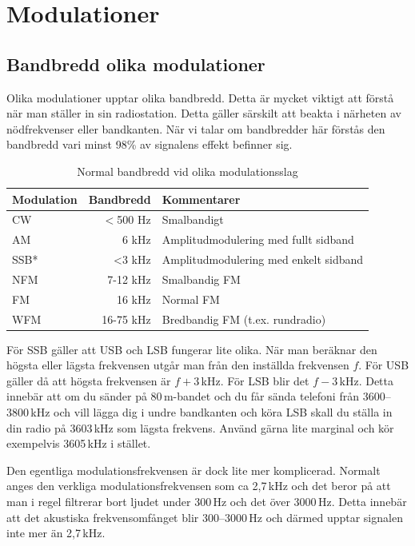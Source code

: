 \section{Modulationer}

\subsection{Bandbredd olika modulationer}

Olika modulationer upptar olika bandbredd. Detta är mycket viktigt att förstå
när man ställer in sin radiostation. Detta gäller särskilt att beakta i
närheten av nödfrekvenser eller bandkanten. När vi talar om bandbredder här
förstås den bandbredd vari minst 98\% av signalens effekt befinner sig.

\begin{table}[H]
\centering
\begin{tabular}{lrl}
	\textbf{Modulation} & \textbf{Bandbredd} & \textbf{Kommentarer}                  \\ \hline
	CW                  &          $<$500 Hz & Smalbandigt                           \\
	AM                  &              6 kHz & Amplitudmodulering med fullt sidband  \\
	SSB*                &              <3 kHz & Amplitudmodulering med enkelt sidband \\
	NFM                 &           7-12 kHz & Smalbandig FM                         \\
	FM                  &             16 kHz & Normal FM                             \\
	WFM                 &          16-75 kHz & Bredbandig FM (t.ex. rundradio)
\end{tabular}
\caption{Normal bandbredd vid olika modulationsslag}
\end{table}

För SSB gäller att USB och LSB fungerar lite olika. När man beräknar den
högsta eller lägsta frekvensen utgår man från den inställda frekvensen $f$.
För USB gäller då att högsta frekvensen är $f+3$\,kHz. För LSB blir det
$f-3$\,kHz. Detta innebär att om du sänder på 80\,m-bandet och du får sända
telefoni från 3600--3800\,kHz och vill lägga dig i undre bandkanten och köra
LSB skall du ställa in din radio på 3603\,kHz som lägsta frekvens. Använd
gärna lite marginal och kör exempelvis 3605\,kHz i stället.

Den egentliga modulationsfrekvensen är dock lite mer komplicerad. Normalt
anges den verkliga modulationsfrekvensen som ca 2,7\,kHz och det beror på att
man i regel filtrerar bort ljudet under 300\,Hz och det över 3000\,Hz. Detta
innebär att det akustiska frekvensomfånget blir 300--3000\,Hz och därmed
upptar signalen inte mer än 2,7\,kHz.

